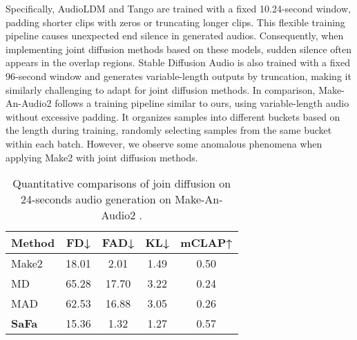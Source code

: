 Specifically, AudioLDM \cite{liu2023audioldm} and Tango \cite{ghosal2023tango} are trained with a fixed 10.24-second window, padding shorter clips with zeros or truncating longer clips. This flexible training pipeline causes unexpected end silence in generated audios. Consequently, when implementing joint diffusion methods based on these models, sudden silence often appears in the overlap regions. Stable Diffusion Audio is also trained with a fixed 96-second window and generates variable-length outputs by truncation, making it similarly challenging to adapt for joint diffusion methods. In comparison, Make-An-Audio2 follows a training pipeline similar to ours, using variable-length audio without excessive padding. It organizes samples into different buckets based on the length during training, randomly selecting samples from the same bucket within each batch. However, we observe some anomalous phenomena when applying Make2 with joint diffusion methods.


\begin{table}[!t]
\centering
\vspace{5pt}
\setlength{\tabcolsep}{3.0mm}
\begin{tabular}{lcccc}
\toprule[1pt]
\textbf{Method} & \textbf{FD↓} & \textbf{FAD↓} & \textbf{KL↓} & \textbf{mCLAP↑} \\ \hline
Make2         & 18.01        & 2.01          & 1.49         & 0.50            \\
MD           & 65.28        & 17.70          & 3.22         & 0.24            \\
MAD          & 62.53        & 16.88         & 3.05         & 0.26            \\
\textbf{SaFa}   & 15.36        & 1.32          & 1.27         & 0.57            \\ 
\bottomrule[1pt]
\end{tabular}
\vspace{-5pt}
\caption{Quantitative comparisons of join diffusion on 24-seconds audio generation on Make-An-Audio2 \cite{Huang2023MakeAnAudio2T}.}
\vspace{-15pt}
\label{tab:ap2}
\end{table}




